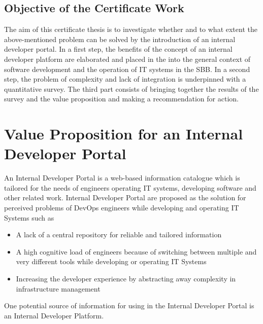 \documentclass[a4paper,12pt]{article}
\begin{document}
    \subsection{Objective of the Certificate Work}
    \label{subsec:iobjective}
    The aim of this certificate thesis is to investigate whether and to what extent the above-mentioned problem
    can be solved by the introduction of an internal developer portal.
    In a first step, the benefits of the concept of an internal developer platform are elaborated and placed in the
    into the general context of software development and the operation of IT systems in the SBB.
    In a second step, the problem of complexity and lack of integration is underpinned with a quantitative survey.
    The third part consists of bringing together the results of the survey and the value proposition and making a
    recommendation for action.

    \section{Value Proposition for an Internal Developer Portal}
    \label{sec:vp}
    An Internal Developer Portal is a web-based information catalogue which is tailored for the needs of
    engineers operating IT systems, developing software and other related work.
    Internal Developer Portal are proposed as the solution for perceived problems\parencite{backstagestory} of DevOps
    engineers while developing and operating IT Systems such as
    \begin{itemize}
        \item A lack of a central repository for reliable and tailored information
        \item A high cognitive load of engineers because of switching between multiple and very different tools while developing or operating IT Systems
        \item Increasing the developer experience by abstracting away complexity in infrastructure management
    \end{itemize}
    One potential source of information for using in the Internal Developer Portal is an Internal Developer Platform.
\end{document}
